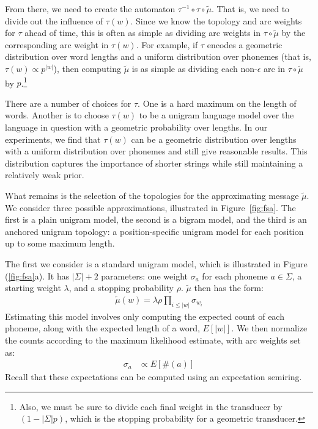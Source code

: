 \documentclass[11pt,a4paper]{article}
\begin{document}
From there, we need to create the automaton $\tau^{-1}
\circ\tau\circ\tilde\mu$. That is, we need to divide out the influence
of $\tau(w)$. Since we know the topology and arc weights for $\tau$
ahead of time, this is often as simple as dividing arc weights in
$\tau\circ\tilde\mu$ by the corresponding arc weight in $\tau(w)$.
For example, if $\tau$ encodes a geometric distribution over word
lengths and a uniform distribution over phonemes (that is, $\tau(w)
\propto {p^{|w|}}$), then computing $\tilde\mu$ is as simple as
dividing each non-$\epsilon$ arc in $\tau\circ\tilde\mu$ by $p$.\footnote{Also,
we must be sure to divide each final weight in the transducer
by $(1-|\Sigma| p)$, which is the stopping probability for a geometric
transducer.}

There are a number of choices for $\tau$. One is a hard maximum on
the length of words. Another is to choose $\tau(w)$ to be a unigram
language model over the language in question with a geometric
probability over lengths. In our experiments, we find that $\tau(w)$
can be a geometric distribution over lengths with a uniform
distribution over phonemes and still give reasonable results.
This distribution captures the importance of shorter strings while
still maintaining a relatively weak prior.

What remains is the selection of the topologies for the approximating
message $\tilde\mu$. We consider three possible approximations,
illustrated in Figure~\ref{fig:fsa}. The first is a plain unigram
model, the second is a bigram model, and the third is an anchored
unigram topology: a position-specific unigram model for each position
up to some maximum length.

The first we consider is a standard unigram model, which is illustrated
in Figure (\ref{fig:fsa}a). It has $|\Sigma|+2$ parameters: one
weight $\sigma_a$ for each phoneme $a \in \Sigma$, a starting
weight $\lambda$, and a stopping probability $\rho$. $\tilde\mu$ then has
the form:
\begin{equation*}
  \begin{split}
    \tilde\mu(w) = \lambda \rho \prod_{i \le |w|} \sigma_{w_i}
   \end{split}
 \end{equation*}
Estimating this
model involves only computing the expected count of each phoneme,
along with the expected length of a word, $E[|w|]$. We then normalize
the counts according to the maximum likelihood estimate, with arc
weights set as:
\begin{equation*}
  \begin{split}
    \sigma_a &\propto E[\#(a)]
   \end{split}
 \end{equation*}
Recall that these expectations can be computed using an expectation semiring.
\end{document}
